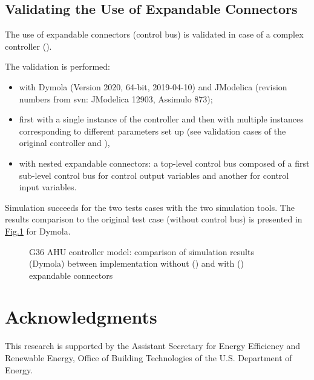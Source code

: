 \documentclass[letterpaper,10pt, openany,english]{sphinxmanual}
\let\sphinxpxdimen\pdfpxdimen\else\newdimen\sphinxpxdimen
\begin{document}
\section{Validating the Use of Expandable Connectors}
\label{\detokenize{annex:validating-the-use-of-expandable-connectors}}\label{\detokenize{annex:sec-annex-bus-valid}}
The use of expandable connectors (control bus) is validated in case of a complex controller ().

The validation is performed:
\begin{itemize}
\item {} 
with Dymola (Version 2020, 64-bit, 2019-04-10) and JModelica (revision numbers from svn: JModelica 12903, Assimulo 873);

\item {} 
first with a single instance of the controller and then with multiple instances corresponding to different parameters set up (see validation cases of the original controller  and ),

\item {} 
with nested expandable connectors: a top-level control bus composed of a first sub-level control bus for control output variables and another for control input variables.

\end{itemize}

Simulation succeeds for the two tests cases with the two simulation tools.
The results comparison to the original test case (without control bus) is presented in \hyperref[\detokenize{annex:annex-valid-bus}]{Fig.\@ \ref{\detokenize{annex:annex-valid-bus}}} for Dymola.

\begin{figure}[htbp]
\centering
\capstart

\noindent\sphinxincludegraphics[width=800\sphinxpxdimen]{{annex_valid_bus}.pdf}
\caption{G36 AHU controller model: comparison of simulation results (Dymola) between implementation without () and with () expandable connectors}\label{\detokenize{annex:annex-valid-bus}}\end{figure}


\chapter{Acknowledgments}
\label{\detokenize{acknowledgments:acknowledgments}}\label{\detokenize{acknowledgments::doc}}
This research is supported by the Assistant Secretary for Energy Efficiency and Renewable Energy, Office of Building Technologies of the U.S. Department of Energy.
\end{document}

